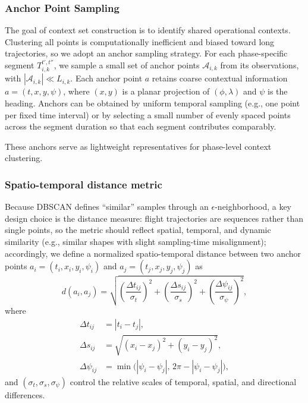 \documentclass[iicol,pdflatex,sn-basic,Numbered]{sn-jnl}%
\theoremstyle{thmstyleone}%
\theoremstyle{thmstyletwo}%
\theoremstyle{thmstylethree}%
\begin{document}
\subsubsection{Anchor Point Sampling}

The goal of context set construction is to identify shared operational contexts.
Clustering all points is computationally inefficient and biased toward long trajectories, so we adopt an anchor sampling strategy.
For each phase-specific segment $T^{t',t''}_{i,k}$, we sample a small set of anchor points $\mathcal{A}_{i,k}$ from its observations, with $|\mathcal{A}_{i,k}| \ll L_{i,k}$.
Each anchor point $a$ retains coarse contextual information $a=(t, x, y, \psi)$, where $(x,y)$ is a planar projection of $(\phi,\lambda)$ and $\psi$ is the heading.
Anchors can be obtained by uniform temporal sampling (e.g., one point per fixed time interval) or by selecting a small number of evenly spaced points across the segment duration so that each segment contributes comparably.

These anchors serve as lightweight representatives for phase-level context clustering.

\subsubsection{Spatio-temporal distance metric}

Because DBSCAN defines ``similar'' samples through an $\epsilon$-neighborhood, a key design choice is the distance measure: flight trajectories are sequences rather than single points, so the metric should reflect spatial, temporal, and dynamic similarity (e.g., similar shapes with slight sampling-time misalignment); accordingly, we define a normalized spatio-temporal distance between two anchor points $a_i=(t_i,x_i,y_i,\psi_i)$ and $a_j=(t_j,x_j,y_j,\psi_j)$ as
\begin{equation}
\label{eq:cohort_distance}
d(a_i,a_j)=
\sqrt{\left(\frac{\Delta t_{ij}}{\sigma_t}\right)^2+\left(\frac{\Delta s_{ij}}{\sigma_s}\right)^2+\left(\frac{\Delta\psi_{ij}}{\sigma_{\psi}}\right)^2},
\end{equation}
where
\begin{align}
\Delta t_{ij} &= |t_i-t_j|,\\
\Delta s_{ij} &= \sqrt{(x_i-x_j)^2+(y_i-y_j)^2},\\
\Delta\psi_{ij} &= \min\big(|\psi_i-\psi_j|,\, 2\pi-|\psi_i-\psi_j|\big),
\end{align}
and $(\sigma_t,\sigma_s,\sigma_{\psi})$ control the relative scales of temporal, spatial, and directional differences.
\end{document}
